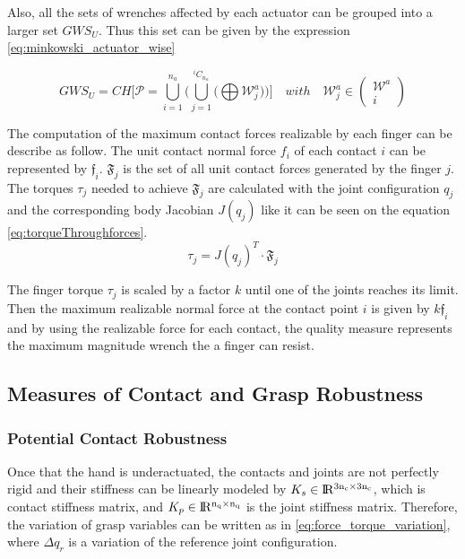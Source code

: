 Also, all the sets of wrenches affected by each actuator can be grouped into a larger set $GWS_U$. Thus this set can be given by the expression \eqref{eq:minkowski_actuator_wise}

\begin{equation}\label{eq:minkowski_actuator_wise}
    GWS_U = CH\Bigg[
    \mathcal{P}=\bigcup_{i=1}^{n_a}\Bigg(\bigcup_{j=1}^{{}^iC_{n_a}} \big( \bigoplus \mathcal{W}_j^a \big) \Bigg) \Bigg]
    \quad with \quad \mathcal{W}^a_j \in 
\left( \begin{array}{c}
             \mathcal{W}^a    \\
              i  
    \end{array} \right) 
\end{equation}

The computation of the maximum contact forces realizable by each finger can be describe as follow. The unit contact normal force $f_i$ of each contact $i$ can be represented by $\mathfrak{f}_i$.  $\mathfrak{F}_j$ is the set of all unit contact forces generated by the finger $j$. The torques $\tau_j$ needed to achieve  $\mathfrak{F}_j$ are calculated with the joint configuration $q_j$ and the corresponding body Jacobian $J(q_j)$ like it can be seen on the equation \eqref{eq:torqueThroughforces}.
\begin{equation}\label{eq:torqueThroughforces}
    \tau_j = J(q_j)^T \cdot \mathfrak{F}_j
\end{equation}

The finger torque $\tau_j$ is scaled by a factor $k$ until one of the joints reaches its limit. Then the maximum realizable normal force at the contact point $i$ is given by $k\mathfrak{f}_i$ and by using the realizable force for each contact, the quality measure represents the maximum magnitude wrench the a finger can resist.

\subsection{Measures of Contact and Grasp Robustness}

\subsubsection{Potential Contact Robustness}

Once that the hand is underactuated, the contacts and joints are not perfectly rigid and their stiffness can be linearly modeled by $K_s \in \rm I\!R^{3n_c \times 3n_c} $, which is contact stiffness matrix, and $K_p \in \rm I\!R^{n_q \times n_q} $ is the joint stiffness matrix.
Therefore, the variation of grasp variables can be written as in \eqref{eq:force_torque_variation}, where $\Delta q_r$ is a variation of the reference joint configuration.

